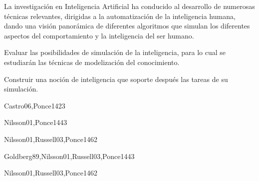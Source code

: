 \begin{syllabus}


\begin{justification}
La investigación en Inteligencia Artificial ha conducido al desarrollo de
numerosas técnicas relevantes, dirigidas a la automatización de la
inteligencia humana, dando una visión panorámica de diferentes
algoritmos que simulan los diferentes aspectos del comportamiento
y la inteligencia del ser humano.
\end{justification}

\begin{goals}
\item Evaluar las posibilidades de simulación de la inteligencia, para lo cual se estudiarán las técnicas de modelización del conocimiento.
\item Construir una noción de inteligencia que soporte después las tareas de su simulación.
\end{goals}

\begin{outcomes}
\end{outcomes}

\begin{unit}{\ISFundamentalIssuesDef}{Castro06,Ponce14}{2}{3}
    \ISFundamentalIssuesAllTopics
    \ISFundamentalIssuesAllObjectives
\end{unit}

\begin{unit}{\ISBasicSearchStrategiesDef}{Nilsson01,Ponce14}{4}{3}
    \ISBasicSearchStrategiesAllTopics
    \ISBasicSearchStrategiesAllObjectives
\end{unit}

\begin{unit}{\ISKnowledgementBasedReasoningDef}{Nilsson01,Russell03,Ponce14}{6}{2}
    \ISKnowledgementBasedReasoningAllTopics
    \ISKnowledgementBasedReasoningAllObjectives
\end{unit}

\begin{unit}{\ISAdvancedSearchDef}{Goldberg89,Nilsson01,Russell03,Ponce14}{4}{3}
     \ISAdvancedSearchAllTopics
     \ISAdvancedSearchAllObjectives
\end{unit}

\begin{unit}{\ISAdvancedReasoningDef}{Nilsson01,Russell03,Ponce14}{6}{2}
    \ISAdvancedReasoningAllTopics
    \ISAdvancedReasoningAllObjectives
\end{unit}


\end{syllabus}
